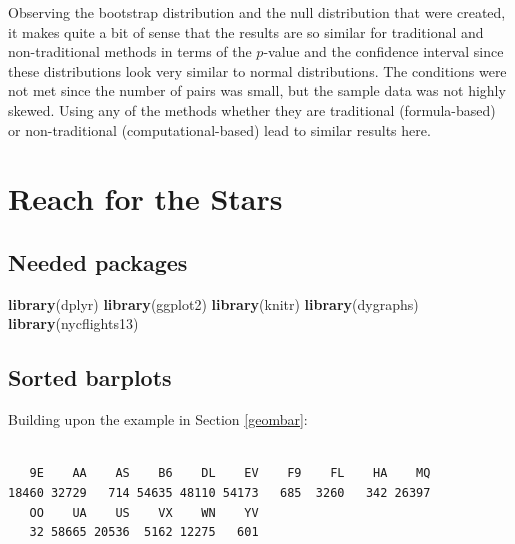 \documentclass[12pt,]{krantz}
\makeatletter
\newenvironment{Shaded}{\begin{snugshade}}{\end{snugshade}}
\newcommand{\KeywordTok}[1]{\textcolor[rgb]{0.27,0.27,0.27}{\textbf{#1}}}
\newcommand{\StringTok}[1]{\textcolor[rgb]{0.5,0.5,0.5}{#1}}
\newcommand{\OperatorTok}[1]{\textcolor[rgb]{0.43,0.43,0.43}{\textbf{#1}}}
\newcommand{\NormalTok}[1]{#1}
\newenvironment{kframe}{%
\medskip{}
\setlength{\fboxsep}{.8em}
 \def\at@end@of@kframe{}%
 \ifinner\ifhmode%
  \def\at@end@of@kframe{\end{minipage}}%
  \begin{minipage}{\columnwidth}%
 \fi\fi%
 \def\FrameCommand##1{\hskip\@totalleftmargin \hskip-\fboxsep
 \colorbox{shadecolor}{##1}\hskip-\fboxsep
     \hskip-\linewidth \hskip-\@totalleftmargin \hskip\columnwidth}%
 \MakeFramed {\advance\hsize-\width
   \@totalleftmargin\z@ \linewidth\hsize
   \@setminipage}}%
 {\par\unskip\endMakeFramed%
 \at@end@of@kframe}
\renewenvironment{Shaded}{\begin{kframe}}{\end{kframe}}
\theoremstyle{definition}
\theoremstyle{definition}
\theoremstyle{definition}
\theoremstyle{remark}
\makeatother
\begin{document}
Observing the bootstrap distribution and the null distribution that were
created, it makes quite a bit of sense that the results are so similar
for traditional and non-traditional methods in terms of the \(p\)-value
and the confidence interval since these distributions look very similar
to normal distributions. The conditions were not met since the number of
pairs was small, but the sample data was not highly skewed. Using any of
the methods whether they are traditional (formula-based) or
non-traditional (computational-based) lead to similar results here.

\chapter{Reach for the Stars}\label{appendixC}

\section*{Needed packages}\label{needed-packages-11}


\begin{Shaded}
\begin{Highlighting}[]
\KeywordTok{library}\NormalTok{(dplyr)}
\KeywordTok{library}\NormalTok{(ggplot2)}
\KeywordTok{library}\NormalTok{(knitr)}
\KeywordTok{library}\NormalTok{(dygraphs)}
\KeywordTok{library}\NormalTok{(nycflights13)}
\end{Highlighting}
\end{Shaded}

\section{Sorted barplots}\label{sorted-barplots}

Building upon the example in Section \ref{geombar}:

\begin{Shaded}
\end{Shaded}

\begin{verbatim}

   9E    AA    AS    B6    DL    EV    F9    FL    HA    MQ 
18460 32729   714 54635 48110 54173   685  3260   342 26397 
   OO    UA    US    VX    WN    YV 
   32 58665 20536  5162 12275   601 
\end{verbatim}
\end{document}
